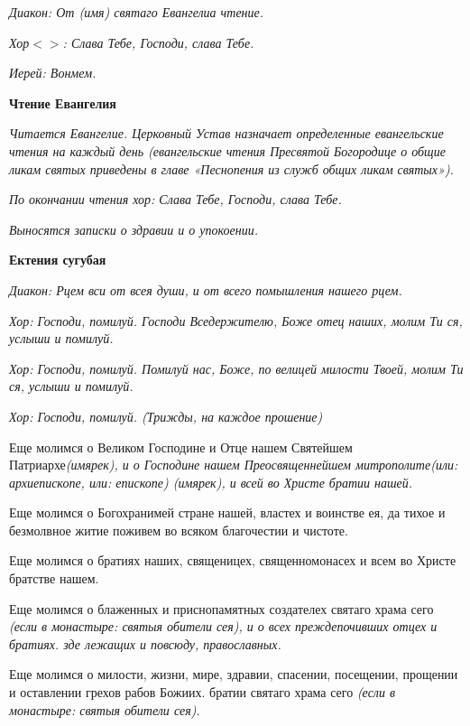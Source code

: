 \itshape Диакон:\normalfont{} От \itshape (имя\normalfont{}) святаго Евангелиа чтение.


\itshape Хор$<$\normalfont{}$>$: Слава Тебе, Господи, слава Тебе.


\itshape Иерей:\normalfont{} Вонмем.


\medskip
\bfseries Чтение Евангелия\normalfont{}


\itshape Читается Евангелие. Церковный Устав назначает определенные евангельские чтения на каждый день (евангельские чтения Пресвятой Богородице о общие ликам святых приведены в главе «Песнопения из служб общих ликам святых»).\normalfont{}


\itshape По окончании чтения хор:\normalfont{} Слава Тебе, Господи, слава Тебе.


\itshape Выносятся записки о здравии и о упокоении.\normalfont{}


\medskip
\bfseries Ектения сугубая\normalfont{}


\itshape Диакон:\normalfont{} Рцем вси от всея души, и от всего помышления нашего рцем.


\itshape  Хор:\normalfont{} Господи, помилуй. Господи Вседержителю, Боже отец наших, молим Ти ся, услыши и помилуй.


\itshape  Хор:\normalfont{} Господи, помилуй. Помилуй нас, Боже, по велицей милости Твоей, молим Ти ся, услыши и помилуй.


\itshape  Хор:\normalfont{} Господи, помилуй. \itshape (Трижды, на каждое прошение)\normalfont{} 


Еще молимся о Великом Господине и Отце нашем Святейшем Патриархе\itshape  (имярек)\normalfont{}, и о Господине нашем Преосвященнейшем митрополите\itshape  (или:\normalfont{} архиепископе\itshape , или:\normalfont{} епископе\itshape ) (имярек)\normalfont{}, и всей во Христе братии нашей. 


Еще молимся о Богохранимей стране нашей, властех и воинстве ея, да тихое и безмолвное житие поживем во всяком благочестии и чистоте. 


Еще молимся о братиях наших, священицех, священномонасех и всем во Христе братстве нашем.


Еще молимся о блаженных и приснопамятных создателех святаго храма сего \itshape (если в монастыре:\normalfont{} святыя обители сея), и о всех преждепочивших отцех и братиях. зде лежащих и повсюду, православных. 


Еще молимся о милости, жизни, мире, здравии, спасении, посещении, прощении и оставлении грехов рабов Божиих. братии святаго храма сего \itshape (если в монастыре:\normalfont{} святыя обители сея). 



